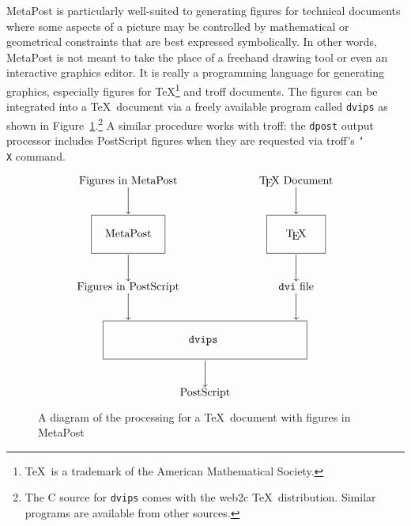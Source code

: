 \documentclass{article} %
\begin{document}
MetaPost is particularly well-suited to generating figures for technical
documents where some aspects of a picture may be controlled by
mathematical or geometrical constraints that are best expressed
symbolically.  In other words, MetaPost is not meant to take the place
of a freehand drawing tool or even an interactive graphics editor.  It
is really a programming language for generating graphics, especially
figures for \TeX\footnote{\TeX\ is a trademark of the American
Mathematical Society.} and troff documents.
The figures can be integrated into a \TeX\ document via a freely
available program called {\tt dvips} as shown in
Figure~\ref{fig0}.\footnote{The C source for {\tt dvips} comes with the
web2c \TeX\ distribution. Similar programs are available from other
sources.}  A similar procedure works with troff: the {\tt dpost} output
processor includes PostScript figures when they are requested via
troff's {\tt \char`\\X} command.

\begin{figure}[htp]
$$ \def\fbox#1{\hbox{\vrule
        \vbox{\hrule\kern5pt\hbox{\kern5pt\hbox{#1}\kern5pt}\kern5pt\hrule}%
        \vrule}}
   \vbox{
    \halign{$\hfil#\hfil$&\hskip1in$\hfil#\hfil$\cr
        \hbox{Figures in MetaPost}&
        \hbox{\TeX\ Document}
        \cr
        \bigg\downarrow&
        \bigg\downarrow
        \cr
        \fbox{\vrule height.2in depth.133in width0pt
                \kern .1in MetaPost\kern.1in}
        &
        \fbox{\vrule height.2in depth.133in width0pt
                \kern .167in \TeX\kern.167in}
        \cr
        \bigg\downarrow&
        \bigg\downarrow
        \cr
        \hbox{Figures in PostScript}&
        \hbox{{\tt dvi} file}
        \cr
        \bigg\downarrow&
        \bigg\downarrow
        \cr
        \fbox{\vrule height.2in depth.133in width0pt
                \kern 1in {\tt dvips} \kern1in}
        \span\omit\cr
        \bigg\downarrow\span\omit\cr
        \hbox{PostScript}\span\omit\cr}}
$$
\caption[A diagram of the processing for a document with MetaPost figures]
        {A diagram of the processing for a \TeX\ document with figures
        in MetaPost}
\label{fig0}
\end{figure}
\end{document}
